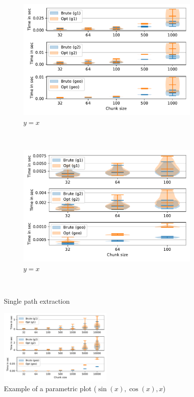 \begin{figure}
     \begin{subfigure}[b]{0.24\textwidth}
         \centering
         \includegraphics[width=\textwidth]{data/raw/core.pdf}
         \caption{$y=x$}
         \label{fig:y equals x}
     \end{subfigure}
     ~\begin{subfigure}[b]{0.24\textwidth}
         \centering
         \includegraphics[width=\textwidth]{data/raw/core_3.pdf}
         \caption{$y=x$}
         \label{fig:y equals x}
     \end{subfigure}\\
   \caption{Single path extraction}
\end{figure}


\begin{figure}[h]
\centering
\includegraphics[width=0.5\textwidth]{data/raw/go.pdf}
\caption{Example of a parametric plot ($\sin (x), \cos(x), x$)}
\end{figure}

